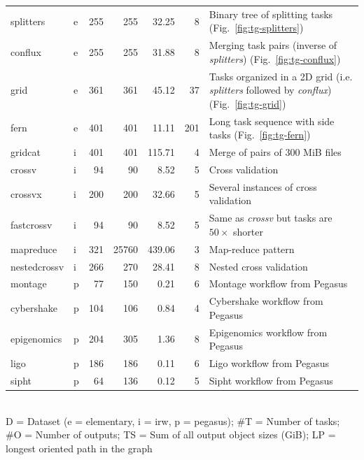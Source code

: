 \begin{table}
\begin{tabular}{l|lrrrr|T}
		splitters        & e & 255 & 255   & 32.25  & 8   & Binary tree of
		splitting tasks (Fig.~\ref{fig:tg-splitters})                                    \\
		conflux          & e & 255 & 255   & 31.88  & 8   & Merging task pairs
		(inverse of \emph{splitters}) (Fig.~\ref{fig:tg-conflux})                        \\
		grid             & e & 361 & 361   & 45.12  & 37  & Tasks organized in a 2D grid
		(i.e. \emph{splitters} followed by \emph{conflux}) (Fig.~\ref{fig:tg-grid})
		\\
		fern             & e & 401 & 401   & 11.11  & 201 & Long task sequence with
		side tasks (Fig.~\ref{fig:tg-fern})                                              \\ \hline
		gridcat          & i & 401 & 401   & 115.71 & 4   & Merge of pairs of 300 MiB
		files                                                                            \\
		crossv           & i & 94  & 90    & 8.52   & 5   & Cross validation             \\
		crossvx          & i & 200 & 200   & 32.66  & 5   & Several instances of cross
		validation                                                                       \\
		fastcrossv       & i & 94  & 90    & 8.52   & 5   & Same as \emph{crossv}
		but tasks are $50\times$ shorter                                                 \\
		mapreduce        & i & 321 & 25760 & 439.06 & 3   & Map-reduce pattern           \\
		nestedcrossv     & i & 266 & 270   & 28.41  & 8   & Nested cross
		validation                                                                       \\ \hline
		montage          & p & 77  & 150   & 0.21   & 6   & Montage workflow
		from Pegasus                                                                     \\
		cybershake       & p & 104 & 106   & 0.84   & 4   & Cybershake
		workflow from Pegasus                                                            \\
		epigenomics      & p & 204 & 305   & 1.36   & 8   & Epigenomics
		workflow from Pegasus                                                            \\
		ligo             & p & 186 & 186   & 0.11   & 6   & Ligo workflow from
		Pegasus                                                                          \\
		sipht            & p & 64  & 136   & 0.12   & 5   & Sipht workflow from
		Pegasus                                                                          \\
		\bottomrule
	\end{tabular}\\
	\vspace{2mm}
	D = Dataset (e = elementary, i = irw, p = pegasus); \#T = Number of tasks; \#O = Number of outputs;
	TS = Sum of all output object sizes (GiB); LP = longest oriented path in the graph


\end{table}
